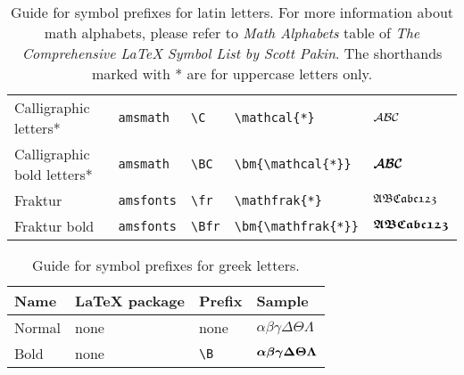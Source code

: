 \documentclass[]{article}
\begin{document}
\begin{table}[htbp]
\begin{tabular}{p{14em} l l l l}
    Calligraphic letters* & \texttt{amsmath} & \verb+\C+ & \verb+\mathcal{*}+ & $\mathcal{A}\mathcal{B}\mathcal{C}$ \\
    Calligraphic bold letters* & \texttt{amsmath} & \verb+\BC+ & \verb+\bm{\mathcal{*}}+ & $\bm{\mathcal{A}}\bm{\mathcal{B}}\bm{\mathcal{C}}$ \\
    Fraktur & \texttt{amsfonts} & \verb+\fr+ & \verb+\mathfrak{*}+ & $\mathfrak{A}\mathfrak{B}\mathfrak{C}\mathfrak{a}\mathfrak{b}\mathfrak{c}\mathfrak{1}\mathfrak{2}\mathfrak{3}$\\
    Fraktur bold & \texttt{amsfonts} & \verb+\Bfr+ & \verb+\bm{\mathfrak{*}}+ & $\bm{\mathfrak{A}}\bm{\mathfrak{B}}\bm{\mathfrak{C}}\bm{\mathfrak{a}}\bm{\mathfrak{b}}\bm{\mathfrak{c}}\bm{\mathfrak{1}}\bm{\mathfrak{2}}\bm{\mathfrak{3}}$\\
    \bottomrule
  \end{tabular}
  \caption{Guide for symbol prefixes for latin letters. For more information about math alphabets,
    please refer to {\em Math Alphabets} table of
    \emph{The Comprehensive \LaTeX{} Symbol List by Scott Pakin}.
    The shorthands marked with * are for uppercase letters only.}
  \label{tb:math}
\end{table}



\begin{table}[htbp]
  \centering
\begin{tabular}{p{14em} l l l}
  \toprule
  Name & \LaTeX{} package & Prefix & Sample \\
  \midrule
  Normal & none & none & $\alpha\beta\gamma\Delta\Theta\Lambda$ \\
  Bold & none & \verb+\B+ & $\bm{\alpha}\bm{\beta}\bm{\gamma}\bm{\Delta}\bm{\Theta}\bm{\Lambda}$ \\
  \bottomrule
\end{tabular}
\caption{Guide for symbol prefixes for greek letters.}
\label{tb:greek1}
\end{table}
\end{document}
